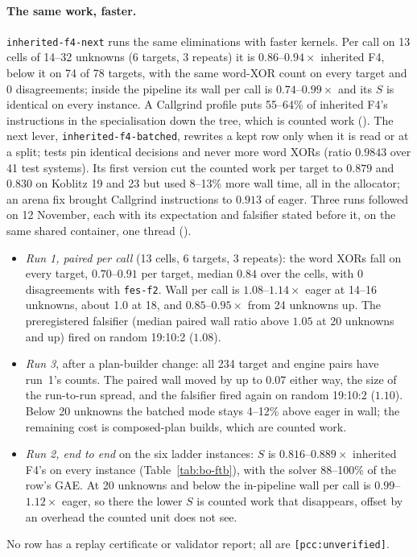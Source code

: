\paragraph{The same work, faster.} \texttt{inherited-f4-next} runs the same
eliminations with faster kernels. Per call on 13 cells of 14--32 unknowns
(6 targets, 3 repeats) it is $0.86$--$0.94\times$ inherited F4, below it on
74 of 78 targets, with the same word-XOR count on every target and 0
disagreements; inside the pipeline its wall per call is $0.74$--$0.99\times$
and its $S$ is identical on every instance. A Callgrind profile puts
55--64\% of inherited F4's instructions in the specialisation down the
tree, which is counted work
(). The next lever,
\texttt{inherited-f4-batched}, rewrites a kept row only when it is read or
at a split; tests pin identical decisions and never more word XORs (ratio
$0.9843$ over 41 test systems). Its first version cut the counted work per
target to $0.879$ and $0.830$ on Koblitz 19 and 23 but used 8--13\% more
wall time, all in the allocator; an arena fix brought Callgrind
instructions to $0.913$ of eager. Three runs followed on 12 November, each
with its expectation and falsifier stated before it, on the same shared
container, one thread ().
\begin{itemize}
\item \emph{Run 1, paired per call} (13 cells, 6 targets, 3 repeats): the
  word XORs fall on every target, $0.70$--$0.91$ per target, median $0.84$
  over the cells, with 0 disagreements with \texttt{fes-f2}. Wall per call
  is $1.08$--$1.14\times$ eager at 14--16 unknowns, about 1.0 at 18, and
  $0.85$--$0.95\times$ from 24 unknowns up. The preregistered falsifier
  (median paired wall ratio above $1.05$ at 20 unknowns and up) fired on
  random 19:10:2 ($1.08$).
\item \emph{Run 3}, after a plan-builder change: all 234 target and engine
  pairs have run~1's counts. The paired wall moved by up to $0.07$ either
  way, the size of the run-to-run spread, and the falsifier fired again on
  random 19:10:2 ($1.10$). Below 20 unknowns the batched mode stays 4--12\%
  above eager in wall; the remaining cost is composed-plan builds, which
  are counted work.
\item \emph{Run 2, end to end} on the six ladder instances: $S$ is
  $0.816$--$0.889\times$ inherited F4's on every instance
  (Table~\ref{tab:bo-ftb}), with the solver 88--100\% of the row's GAE.
  At 20 unknowns and below the in-pipeline wall per call is
  $0.99$--$1.12\times$ eager, so there the lower $S$ is counted work that
  disappears, offset by an overhead the counted unit does not see.
\end{itemize}
No row has a replay certificate or validator report; all are
\texttt{[pcc:unverified]}.


